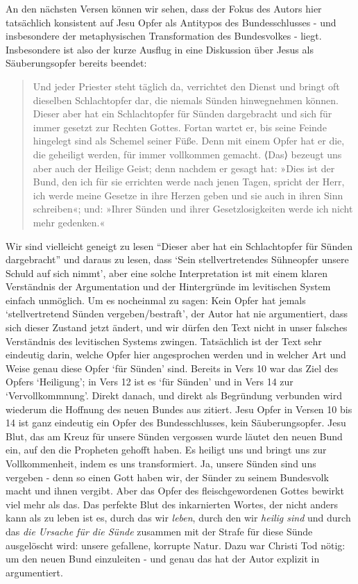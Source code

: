 An den nächsten Versen können wir sehen, dass der Fokus des Autors hier tatsächlich konsistent auf Jesu Opfer als Antitypos des Bundesschlusses -
und insbesondere der metaphysischen Transformation des Bundesvolkes - liegt.
Insbesondere ist also der kurze Ausflug in eine Diskussion über Jesus als Säuberungsopfer bereits beendet:
\begin{quote}
Und jeder Priester steht täglich da, verrichtet den Dienst und bringt oft dieselben Schlachtopfer dar, die niemals Sünden hinwegnehmen können.
Dieser aber hat ein Schlachtopfer für Sünden dargebracht und sich für immer gesetzt zur Rechten Gottes.
Fortan wartet er, bis seine Feinde hingelegt sind als Schemel seiner Füße.
Denn mit einem Opfer hat er die, die geheiligt werden, für immer vollkommen gemacht.
⟨Das⟩ bezeugt uns aber auch der Heilige Geist; denn nachdem er gesagt hat:
»Dies ist der Bund, den ich für sie errichten werde nach jenen Tagen, spricht der Herr, ich werde meine Gesetze in ihre Herzen geben und sie auch in ihren Sinn schreiben«;
und: »Ihrer Sünden und ihrer Gesetzlosigkeiten werde ich nicht mehr gedenken.«
\end{quote}
Wir sind vielleicht geneigt zu lesen ``Dieser aber hat ein Schlachtopfer für Sünden dargebracht'' und daraus zu lesen, dass `Sein stellvertretendes Sühneopfer unsere Schuld auf sich nimmt', aber eine solche Interpretation ist mit einem klaren Verständnis der Argumentation und der Hintergründe im levitischen System einfach unmöglich.
Um es nocheinmal zu sagen:
Kein Opfer hat jemals `stellvertretend Sünden vergeben/bestraft',
der Autor hat nie argumentiert, dass sich dieser Zustand jetzt ändert,
und wir dürfen den Text nicht in unser falsches Verständnis des levitischen Systems zwingen.
Tatsächlich ist der Text sehr eindeutig darin, welche Opfer hier angesprochen werden und in welcher Art und Weise genau diese Opfer `für Sünden' sind.
Bereits in Vers 10 war das Ziel des Opfers `Heiligung'; in Vers 12 ist es `für Sünden' und in Vers 14 zur `Vervollkommnung'.
Direkt danach, und direkt als Begründung verbunden wird wiederum die Hoffnung des neuen Bundes aus  zitiert.
Jesu Opfer in Versen 10 bis 14 ist ganz eindeutig ein Opfer des Bundesschlusses, kein Säuberungsopfer.
Jesu Blut, das am Kreuz für unsere Sünden vergossen wurde läutet den neuen Bund ein, auf den die Propheten gehofft haben.
Es heiligt uns und bringt uns zur Vollkommenheit, indem es uns transformiert.
Ja, unsere Sünden sind uns vergeben - denn so einen Gott haben wir, der Sünder zu seinem Bundesvolk macht und ihnen vergibt.
Aber das Opfer des fleischgewordenen Gottes bewirkt viel mehr als das.
Das perfekte Blut des inkarnierten Wortes, der nicht anders kann als zu leben ist es, durch das wir \textit{leben}, durch den wir \textit{heilig sind} und durch das \textit{die Ursache für die Sünde} zusammen mit der Strafe für diese Sünde ausgelöscht wird: unsere gefallene, korrupte Natur.
Dazu war Christi Tod nötig: um den neuen Bund einzuleiten - und genau das hat der Autor explizit in  argumentiert.

